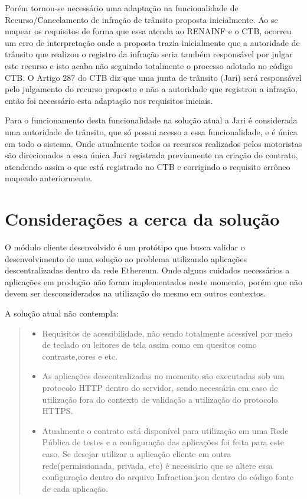 Porém tornou-se necessário uma adaptação na funcionalidade de Recurso/Cancelamento de infração de trânsito proposta inicialmente. Ao se mapear os requisitos de forma que essa atenda ao RENAINF e o CTB, ocorreu um erro de interpretação onde a proposta trazia inicialmente que a autoridade de trânsito que realizou o registro da infração seria também responsável por julgar este recurso e isto acaba não seguindo totalmente o processo adotado no código CTB. O Artigo 287 do CTB diz que uma junta de trânsito (Jari) será responsável pelo julgamento do recurso proposto e não a autoridade que registrou a infração, então foi necessário esta adaptação nos requisitos iniciais.

Para o funcionamento desta funcionalidade na solução atual a Jari é considerada uma autoridade de trânsito, que só possui acesso a essa funcionalidade, e é única em todo o sistema. Onde atualmente todos os recursos realizados pelos motoristas são direcionados a essa única Jari registrada previamente na criação do contrato, atendendo assim o que está registrado no CTB e corrigindo o requisito errôneo mapeado anteriormente.


\section{Considerações a cerca da solução}

O módulo cliente desenvolvido é um protótipo que busca validar o desenvolvimento de uma solução ao problema utilizando aplicações descentralizadas dentro da rede Ethereum. Onde alguns cuidados necessários a aplicações em produção não foram implementados neste momento, porém que não devem ser desconsiderados na utilização do mesmo em outros contextos.

A solução atual não contempla:

    \begin{quote}
        \begin{itemize}
            \item Requisitos de acessibilidade, não sendo totalmente acessível por meio de teclado ou leitores de tela assim como em quesitos como contraste,cores e etc.
            \item As aplicações descentralizadas no momento são executadas sob um protocolo HTTP dentro do servidor, sendo necessária em caso de utilização fora do contexto de validação a utilização do protocolo HTTPS.
             \item Atualmente o contrato está disponível para utilização em uma Rede Pública de testes e a configuração das aplicações foi feita para este caso. Se desejar utilizar a aplicação cliente em outra rede(permissionada, privada, etc) é necessário que se altere essa configuração dentro do arquivo Infraction.json dentro do código fonte de cada aplicação.
        \end{itemize}
    \end{quote}
    

